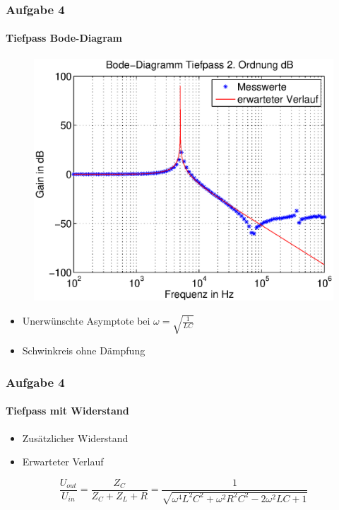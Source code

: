 \begin{frame}
\frametitle{Aufgabe 4}
\framesubtitle{Tiefpass Bode-Diagram}
    \begin{figure}[H]
    \begin{center}
            \includegraphics[scale=0.50]{./img/4a_bode_tief_dB.eps}
    \end{center}
    \end{figure}  
\begin{itemize}
    \item Unerwünschte Asymptote bei $\omega = \sqrt{\frac{1}{LC}}$
    \item Schwinkreis ohne Dämpfung
\end{itemize}
\end{frame}
\begin{frame}
    \frametitle{Aufgabe 4}
    \framesubtitle{Tiefpass mit Widerstand}
     \begin{itemize}
        \item Zusätzlicher Widerstand
         \item Erwarteter Verlauf
     \end{itemize}
     \begin{equation*}
         \frac{U_{out}}{U_{in}}
         =
         \frac{Z_C}{Z_C + Z_L + R}
         =
         \frac{1}{\sqrt{\omega^4 L^2 C^2 + \omega^2 R^2 C^2 - 2 \omega^2 LC + 1}}
     \end{equation*}
\end{frame}
